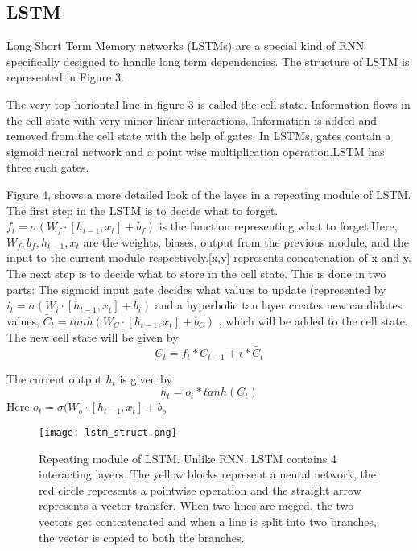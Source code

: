 \documentclass[12pt,a4paper]{article}
\numberwithin{equation}{section}
\begin{document}
\subsection{LSTM}

Long Short Term Memory networks (LSTMs) are a special kind of RNN specifically designed to handle long term dependencies. The structure of LSTM is represented in Figure 3.

The very top horiontal line in figure 3 is called the cell state. Information flows in the cell state with very minor linear interactions. Information is added and removed from the cell state with the help of gates. In LSTMs, gates contain a sigmoid neural network and a point wise multiplication operation.LSTM has three such gates.

Figure 4, shows a more detailed look of the layes in a repeating module of LSTM. The first step in the LSTM is to decide what to forget. $f_t = \sigma (W_f \cdot [h_{t-1},x_t]+b_f )$ is the function representing what to forget.Here, $W_f,b_f ,h_{t-1},x_t $ are the weights, biases, output from the previous module, and the input to the current module respectively.[x,y] represents concatenation of x and y. The next step is to decide what to store in the cell state. This is done in two parts: The sigmoid input gate decides what values to update (represented by $i_t =\sigma (W_i \cdot [h_{t-1},x_t]+b_i ) $ and a hyperbolic tan layer creates new candidates values, $\widetilde{C_t} =tanh(W_C \cdot [h_{t-1},x_t]+b_C) $  ,  which will be added to the cell state. The  new cell state will be given by 
\begin{equation*}
    C_t = f_t*C_{t-1} + i*\widetilde{C_t}
\end{equation*}

The current output $h_t $ is given by 
\begin{equation*}
    h_t = o_t * tanh(C_t)
\end{equation*}
Here $o_t =\sigma (W_o \cdot [h_{t-1},x_t]+b_o  $

\begin{figure}
    \centering
    \texttt{[image: lstm\_struct.png]}
    \caption{Repeating module of LSTM. Unlike RNN, LSTM contains 4 interacting layers. The yellow blocks represent a neural network, the red circle represents a pointwise operation and the straight arrow represents a vector transfer. When two lines are meged, the two vectors get contcatenated and when a line is split into two branches, the vector is copied to both the branches.   }
   
  
 
 
    \label{fig:my_label}
\end{figure}
\end{document}
